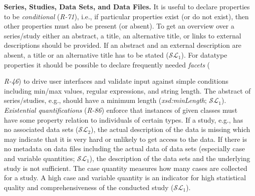 \documentclass{llncs}
\begin{document}
\textbf{Series, Studies, Data Sets, and Data Files.}
It is useful to declare properties to be \emph{conditional} (\emph{R-71}), i.e., if particular properties exist (or do not exist), then other properties must also be present (or absent).
To get an overview over a series/study either an abstract, a title, an alternative title, or links to external descriptions should be provided. 
If an abstract and an external description are absent, 
a title or an alternative title has to be stated ($\mathcal{SL}_{1}$).
For datatype properties it should be possible to declare frequently needed \emph{facets} ({\emph{R-46}) to drive user interfaces and validate input against simple conditions including min/max values, regular expressions, and string length.
The abstract of series/studies, e.g., should have a minimum length (\emph{xsd:minLength}; $\mathcal{SL}_{1}$).
\emph{Existential quantifications} (\emph{R-86}) enforce that instances of given classes must have some property relation to individuals of certain types.
If a study, e.g., has no associated data sets ($\mathcal{SL}_{2}$), the actual description of the data is missing which may indicate that it is very hard or unlikely to get access to the data.
If there is no metadata on data files including the actual data of data sets (especially case and variable quantities; $\mathcal{SL}_{1}$), the description of the data sets and the underlying study is not sufficient.
The case quantity measures how many cases are collected for a study.
A high case and variable quantity is an indicator for high statistical quality and comprehensiveness of the conducted study ($\mathcal{SL}_{1}$).

}
\end{document}

